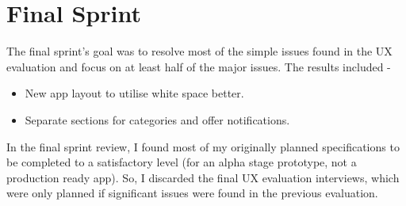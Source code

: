 \section{Final Sprint}

The final sprint's goal was to resolve most of the simple issues found in the UX evaluation and focus on at least half of the major issues. The results included - 

\begin{itemize}
	\item New app layout to utilise white space better.
	\item Separate sections for categories and offer notifications.
\end{itemize}

In the final sprint review, I found most of my originally planned specifications to be completed to a satisfactory level (for an alpha stage prototype, not a production ready app). So, I discarded the final UX evaluation interviews, which were only planned if significant issues were found in the previous evaluation.

